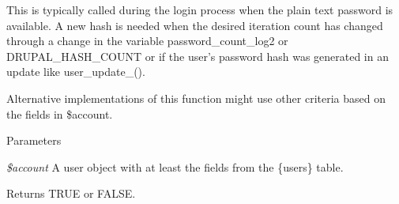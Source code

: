 This is typically called during the login process when the plain text password is available. A new hash is needed when the desired iteration count has changed through a change in the variable password\_\-count\_\-log2 or DRUPAL\_\-HASH\_\-COUNT or if the user's password hash was generated in an update like user\_\-update\_().

Alternative implementations of this function might use other criteria based on the fields in \$account.


\begin{DoxyParams}{Parameters}
\item[{\em \$account}]A user object with at least the fields from the \{users\} table.\end{DoxyParams}
\begin{DoxyReturn}{Returns}
TRUE or FALSE. 
\end{DoxyReturn}
